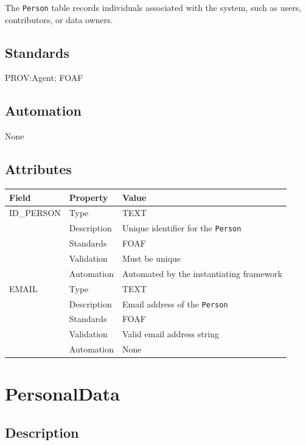 \documentclass[
]{article}
\newcounter{none} %
\begin{document}
The \texttt{Person} table records individuals associated with the
system, such as users, contributors, or data owners.

\subsection{Standards}\label{standards-22}

PROV:Agent; FOAF

\subsection{Automation}\label{automation-22}

None

\subsection{Attributes}\label{attributes-19}

{\def\LTcaptype{none} %
\begin{longtable}[]{@{}lll@{}}
\toprule\noalign{}
Field & Property & Value \\
\midrule\noalign{}
\endhead
\bottomrule\noalign{}
\endlastfoot
ID\_PERSON & Type & TEXT \\
& Description & Unique identifier for the \texttt{Person} \\
& Standards & FOAF \\
& Validation & Must be unique \\
& Automation & Automated by the instantiating framework \\
EMAIL & Type & TEXT \\
& Description & Email address of the \texttt{Person} \\
& Standards & FOAF \\
& Validation & Valid email address string \\
& Automation & None \\
\end{longtable}
}

\section{PersonalData}\label{personaldata}

\subsection{Description}\label{description-21}
\end{document}

